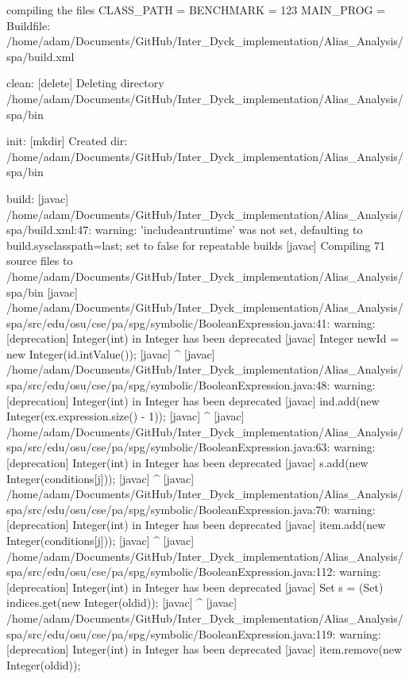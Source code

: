 compiling the files
CLASS_PATH = 
BENCHMARK = 123
MAIN_PROG = 
Buildfile: /home/adam/Documents/GitHub/Inter_Dyck_implementation/Alias_Analysis/spa/build.xml

clean:
   [delete] Deleting directory /home/adam/Documents/GitHub/Inter_Dyck_implementation/Alias_Analysis/spa/bin

init:
    [mkdir] Created dir: /home/adam/Documents/GitHub/Inter_Dyck_implementation/Alias_Analysis/spa/bin

build:
    [javac] /home/adam/Documents/GitHub/Inter_Dyck_implementation/Alias_Analysis/spa/build.xml:47: warning: 'includeantruntime' was not set, defaulting to build.sysclasspath=last; set to false for repeatable builds
    [javac] Compiling 71 source files to /home/adam/Documents/GitHub/Inter_Dyck_implementation/Alias_Analysis/spa/bin
    [javac] /home/adam/Documents/GitHub/Inter_Dyck_implementation/Alias_Analysis/spa/src/edu/osu/cse/pa/spg/symbolic/BooleanExpression.java:41: warning: [deprecation] Integer(int) in Integer has been deprecated
    [javac] 				Integer newId = new Integer(id.intValue());
    [javac] 				                ^
    [javac] /home/adam/Documents/GitHub/Inter_Dyck_implementation/Alias_Analysis/spa/src/edu/osu/cse/pa/spg/symbolic/BooleanExpression.java:48: warning: [deprecation] Integer(int) in Integer has been deprecated
    [javac] 				ind.add(new Integer(ex.expression.size() - 1));
    [javac] 				        ^
    [javac] /home/adam/Documents/GitHub/Inter_Dyck_implementation/Alias_Analysis/spa/src/edu/osu/cse/pa/spg/symbolic/BooleanExpression.java:63: warning: [deprecation] Integer(int) in Integer has been deprecated
    [javac] 				s.add(new Integer(conditions[j]));
    [javac] 				      ^
    [javac] /home/adam/Documents/GitHub/Inter_Dyck_implementation/Alias_Analysis/spa/src/edu/osu/cse/pa/spg/symbolic/BooleanExpression.java:70: warning: [deprecation] Integer(int) in Integer has been deprecated
    [javac] 				item.add(new Integer(conditions[j]));
    [javac] 				         ^
    [javac] /home/adam/Documents/GitHub/Inter_Dyck_implementation/Alias_Analysis/spa/src/edu/osu/cse/pa/spg/symbolic/BooleanExpression.java:112: warning: [deprecation] Integer(int) in Integer has been deprecated
    [javac] 		Set s = (Set) indices.get(new Integer(oldid));
    [javac] 		                          ^
    [javac] /home/adam/Documents/GitHub/Inter_Dyck_implementation/Alias_Analysis/spa/src/edu/osu/cse/pa/spg/symbolic/BooleanExpression.java:119: warning: [deprecation] Integer(int) in Integer has been deprecated
    [javac] 			item.remove(new Integer(oldid));
